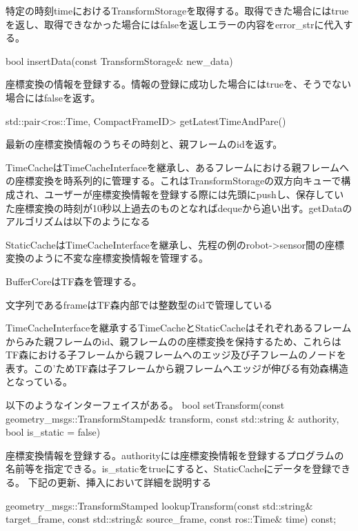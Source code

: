 \documentclass{jarticle}
\begin{document}
\begin{multicols}{2}
特定の時刻timeにおけるTransformStorageを取得する。取得できた場合にはtrueを返し、取得できなかった場合にはfalseを返しエラーの内容をerror\_strに代入する。

bool insertData(const TransformStorage\& new\_data)

座標変換の情報を登録する。情報の登録に成功した場合にはtrueを、そうでない場合にはfalseを返す。

std::pair<ros::Time, CompactFrameID> getLatestTimeAndPare()

最新の座標変換情報のうちその時刻と、親フレームのidを返す。


TimeCacheはTimeCacheInterfaceを継承し、あるフレームにおける親フレームへの座標変換を時系列的に管理する。これはTransformStorageの双方向キューで構成され、ユーザーが座標変換情報を登録する際には先頭にpushし、保存していた座標変換の時刻が10秒以上過去のものとなればdequeから追い出す。getDataのアルゴリズムは以下のようになる






StaticCacheはTimeCacheInterfaceを継承し、先程の例のrobot->sensor間の座標変換のように不変な座標変換情報を管理する。


BufferCoreはTF森を管理する。

文字列であるframeはTF森内部では整数型のidで管理している

TimeCacheInterfaceを継承するTimeCacheとStaticCacheはそれぞれあるフレームからみた親フレームのid、親フレームのの座標変換を保持するため、これらはTF森における子フレームから親フレームへのエッジ及び子フレームのノードを表す。この’ためTF森は子フレームから親フレームへエッジが伸びる有効森構造となっている。


以下のようなインターフェイスがある。
bool setTransform(const geometry\_msgs::TransformStamped\& transform, const std::string \& authority, bool is\_static = false)

座標変換情報を登録する。authorityには座標変換情報を登録するプログラムの名前等を指定できる。is\_staticをtrueにすると、StaticCacheにデータを登録できる。
下記の更新、挿入において詳細を説明する

geometry\_msgs::TransformStamped lookupTransform(const std::string\& target\_frame, const std::string\& source\_frame, const ros::Time\& time) const;
		   

\end{multicols}
\end{document}
